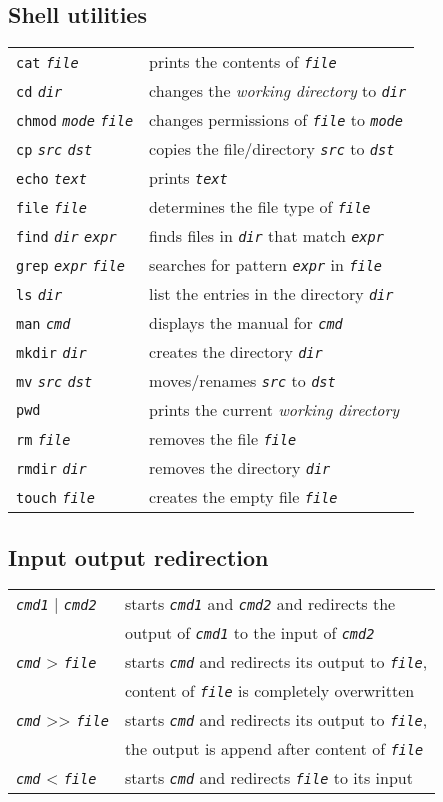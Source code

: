 \documentclass[landscape, a4paper]{article}
\newcommand{\cl}[1]{\texttt{#1}}
\newcommand{\cv}[1]{\textit{\texttt{#1}}}
\begin{document}
\begin{multicols*}{3}
\subsection*{Shell utilities}
\begin{tabular}{ll}
\cl{cat} \cv{file} 				& prints the contents of \cv{file}\\
\cl{cd} \cv{dir} 				& changes the \textit{working directory} to \cv{dir}\\
\cl{chmod} \cv{mode} \cv{file} 	& changes permissions of \cv{file} to \cv{mode}\\
\cl{cp} \cv{src} \cv{dst} 		& copies the file/directory \cv{src} to \cv{dst}\\
\cl{echo} \cv{text} 			& prints \cv{text}\\
\cl{file} \cv{file} 			& determines the file type of \cv{file}\\
\cl{find} \cv{dir} \cv{expr} 	& finds files in \cv{dir} that match \cv{expr}\\
\cl{grep} \cv{expr} \cv{file} 	& searches for pattern \cv{expr} in \cv{file}\\
\cl{ls} \cv{dir} 				& list the entries in the directory \cv{dir}\\
\cl{man} \cv{cmd} 				& displays the manual for \cv{cmd}\\
\cl{mkdir} \cv{dir} 			& creates the directory \cv{dir}\\
\cl{mv} \cv{src} \cv{dst} 		& moves/renames \cv{src} to \cv{dst}\\
\cl{pwd} 						& prints the current \textit{working directory}\\
\cl{rm} \cv{file} 				& removes the file \cv{file}\\
\cl{rmdir} \cv{dir} 			& removes the directory \cv{dir}\\
\cl{touch} \cv{file} 			& creates the empty file \cv{file}
\end{tabular}
\subsection*{Input output redirection}
\begin{tabular}{ll}
\cv{cmd1} | \cv{cmd2} 	& starts \cv{cmd1} and \cv{cmd2} and redirects the\\
					  	& output of \cv{cmd1} to the input of \cv{cmd2}\\
\cv{cmd} > \cv{file} 	& starts \cv{cmd} and redirects its output to \cv{file},\\
						& content of \cv{file} is completely overwritten\\
\cv{cmd} >\null> \cv{file} 	& starts \cv{cmd} and redirects its output to \cv{file},\\
						& the output is append after content of \cv{file}\\
\cv{cmd} < \cv{file}	& starts \cv{cmd} and redirects \cv{file} to its input
					  

\end{tabular}
\end{multicols*}
\end{document}
